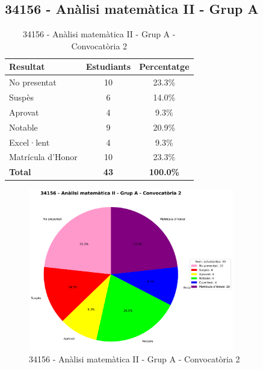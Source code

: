 \documentclass[12pt,a4paper]{article}
\begin{document}
\subsection{34156 - Anàlisi matemàtica II - Grup A}


\begin{table}[H]
\centering
\caption{34156 - Anàlisi matemàtica II - Grup A - Convocatòria 2}
\begin{tabular}{|l|c|c|}
\hline
\textbf{Resultat} & \textbf{Estudiants} & \textbf{Percentatge} \\
\hline
No presentat & 10 & 23.3\% \\
Suspès & 6 & 14.0\% \\
Aprovat & 4 & 9.3\% \\
Notable & 9 & 20.9\% \\
Excel·lent & 4 & 9.3\% \\
Matrícula d'Honor & 10 & 23.3\% \\
\hline
\textbf{Total} & \textbf{43} & \textbf{100.0\%} \\
\hline
\end{tabular}
\end{table}

\begin{figure}[H]
\centering
\includegraphics[width=0.8\textwidth]{graficos/34156_A_A2.png}
\caption{34156 - Anàlisi matemàtica II - Grup A - Convocatòria 2}
\end{figure}

\newpage
\end{document}

